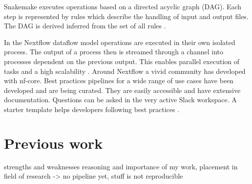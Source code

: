 Snakemake executes operations based on a directed acyclic graph (DAG). Each step is represented by rules which describe the handling of input and output files. The DAG is derived inferred from the set of all rules  \citep{snakemake}. 

In the Nextflow dataflow model operations are executed in their own isolated process. The output of a process then is streamed through a channel into processes dependent on the previous output. This enables parallel execution of tasks and a high scalability \citep{nextflow}.
Around Nextflow a vivid community has developed with nf-core. Best practices pipelines for a wide range of use cases have been developed and are being curated. They are easily accessible and have extensive documentation. Questions can be asked in the very active Slack workspace. A starter template helps developers following best practices \citep{nfcore}.

\section{Previous work}
strengths and weaknesses 
reasoning and importance of my work, placement in field of research -> no pipeline yet, stuff is not reproducible 



